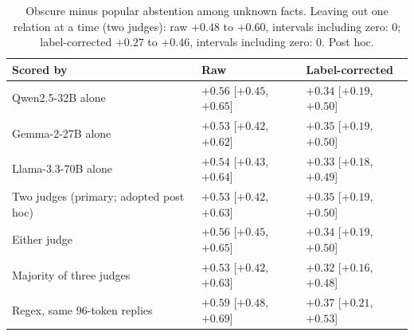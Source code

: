 \begin{table}[h]
\centering\footnotesize\setlength{\tabcolsep}{3pt}
\begin{tabular}{lll}
\toprule
Scored by & Raw & Label-corrected \\
\midrule
Qwen2.5-32B alone & $+0.56$ [$+0.45$, $+0.65$] & $+0.34$ [$+0.19$, $+0.50$] \\
Gemma-2-27B alone & $+0.53$ [$+0.42$, $+0.62$] & $+0.35$ [$+0.19$, $+0.50$] \\
Llama-3.3-70B alone & $+0.54$ [$+0.43$, $+0.64$] & $+0.33$ [$+0.18$, $+0.49$] \\
Two judges (primary; adopted post hoc) & $+0.53$ [$+0.42$, $+0.63$] & $+0.35$ [$+0.19$, $+0.50$] \\
Either judge & $+0.56$ [$+0.45$, $+0.65$] & $+0.34$ [$+0.19$, $+0.50$] \\
Majority of three judges & $+0.53$ [$+0.42$, $+0.63$] & $+0.32$ [$+0.16$, $+0.48$] \\
Regex, same 96-token replies & $+0.59$ [$+0.48$, $+0.69$] & $+0.37$ [$+0.21$, $+0.53$] \\
\bottomrule
\end{tabular}
\caption{Obscure minus popular abstention among unknown facts. Leaving out one relation at a time (two judges): raw $+0.48$ to $+0.60$, intervals including zero: 0; label-corrected $+0.27$ to $+0.46$, intervals including zero: 0. Post hoc.}
\label{tab:x0gap}
\end{table}

